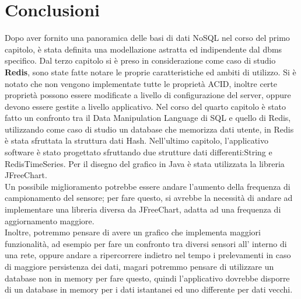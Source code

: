\chapter{Conclusioni}
Dopo aver fornito una panoramica delle basi di dati NoSQL nel corso del primo capitolo,
è stata definita una modellazione astratta ed indipendente dal dbms specifico.
Dal terzo capitolo si è preso in considerazione come caso di studio \textbf{Redis}, sono state fatte notare le proprie caratteristiche
ed ambiti di utilizzo. Si è notato che non vengono implementate tutte le proprietà ACID, inoltre certe proprietà
possono essere modificate a livello di configurazione del server, oppure devono essere gestite a livello applicativo.
Nel corso del quarto capitolo è stato fatto un confronto tra il Data Manipulation Language di SQL
e quello di Redis, utilizzando come caso di studio un database che memorizza dati utente, in Redis è stata sfruttata la struttura dati Hash.
Nell'ultimo capitolo, l'applicativo software è stato progettato sfruttando due strutture dati differenti:String e RedisTimeSeries.
Per il disegno del grafico in Java è stata utilizzata la libreria JFreeChart.\\
Un possibile miglioramento potrebbe essere andare l'aumento della frequenza di campionamento del sensore; per fare questo, si avrebbe la necessità
di andare ad implementare una libreria diversa da JFreeChart, adatta ad una frequenza di aggiornamento maggiore.\\
Inoltre, potremmo pensare di avere un grafico che implementa maggiori funzionalità, ad esempio per fare un confronto tra diversi sensori all' interno di una rete, oppure
andare a ripercorrere indietro nel tempo i prelevamenti in caso di maggiore persistenza dei dati, magari potremmo pensare di utilizzare un database non in memory per fare questo,
quindi l'applicativo dovrebbe disporre di un database in memory per i dati istantanei ed uno differente per dati vecchi.
